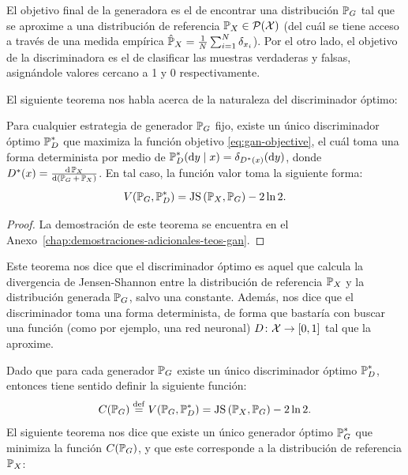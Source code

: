 El objetivo final de la generadora es el de encontrar una distribución $\Prob_G$ tal que se aproxime a una distribución de referencia $\Prob_X \in \ProbSpace[\cX]$ (del cuál se tiene acceso a través de una medida empírica $\hat \Prob_X = \frac{1}{N} \sum_{i=1}^{N} \delta_{x_i}$). Por el otro lado, el objetivo de la discriminadora es el de clasificar las muestras verdaderas y falsas, asignándole valores cercano a 1 y 0 respectivamente.

El siguiente teorema nos habla acerca de la naturaleza del discriminador óptimo:

\begin{theorem}
    \label{thm:gan-optimal-discriminator}
    Para cualquier estrategia de generador $\Prob_G$ fijo, existe un único discriminador óptimo $\Prob_D^\ast$ que maximiza la función objetivo \eqref{eq:gan-objective}, el cuál toma una forma determinista por medio de $\Prob_D^\ast(\dd y \mid x) = \delta_{D^\ast(x)}(\dd y)$, donde $D^\ast(x) = \dv{\Prob_X}{(\Prob_G+\Prob_X)}$. En tal caso, la función valor toma la siguiente forma:
    \begin{equation}
        V(\Prob_G, \Prob_D^\ast) = \JS{\Prob_X}{\Prob_G} - 2 \ln 2.
    \end{equation}
\end{theorem}

\begin{proof}
    La demostración de este teorema se encuentra en el Anexo~\ref{chap:demostraciones-adicionales-teos-gan}.
\end{proof}

Este teorema nos dice que el discriminador óptimo es aquel que calcula la divergencia de Jensen-Shannon entre la distribución de referencia $\Prob_X$ y la distribución generada $\Prob_G$, salvo una constante. Además, nos dice que el discriminador toma una forma determinista, de forma que bastaría con buscar una función (como por ejemplo, una red neuronal) $D\colon\mathcal{X}\to [0, 1]$ tal que la aproxime.

Dado que para cada generador $\Prob_G$ existe un único discriminador óptimo $\Prob_D^\ast$, entonces tiene sentido definir la siguiente función:
\begin{equation}
    C(\Prob_G) \eqdef V(\Prob_G, \Prob_D^\ast) = \JS{\Prob_X}{\Prob_G} - 2 \ln 2.
\end{equation}
El siguiente teorema nos dice que existe un único generador óptimo $\Prob_G^\ast$ que minimiza la función $C(\Prob_G)$, y que este corresponde a la distribución de referencia $\Prob_X$:

